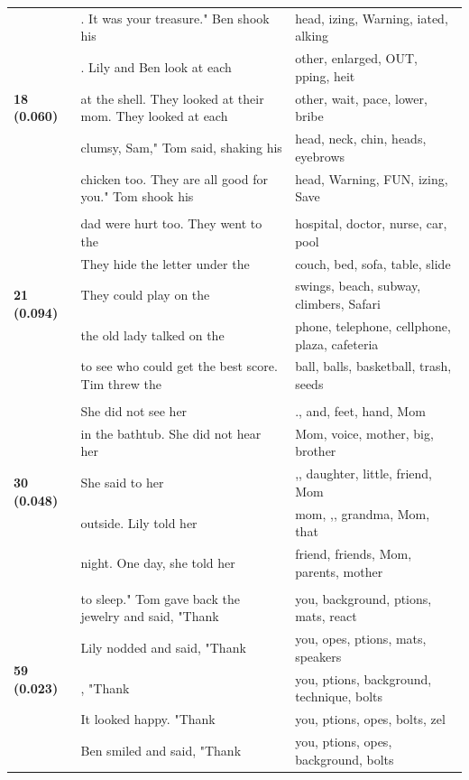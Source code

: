 \documentclass{article}
\theoremstyle{plain}
\theoremstyle{definition}
\theoremstyle{remark}
\begin{document}
\begin{longtable}{|p{}|p{}|p{}|}
\multirow{5}{*}{\textbf{18 (0.060)}} & . It was your treasure."  Ben shook his & head, izing,  Warning, iated, alking \\
& .  Lily and Ben look at each & other,  enlarged,  OUT, pping, heit \\
& at the shell. They looked at their mom. They looked at each & other,  wait,  pace,  lower,  bribe \\
& clumsy, Sam," Tom said, shaking his & head,  neck,  chin,  heads,  eyebrows \\
& chicken too. They are all good for you."  Tom shook his & head,  Warning,  FUN, izing, Save \\
& & \\
\multirow{5}{*}{\textbf{21 (0.094)}} & dad were hurt too. They went to the & hospital,  doctor,  nurse,  car,  pool \\
& They hide the letter under the & couch,  bed,  sofa,  table,  slide \\
& They could play on the & swings,  beach,  subway,  climbers,  Safari \\
& the old lady talked on the & phone,  telephone,  cellphone,  plaza,  cafeteria \\
& to see who could get the best score.  Tim threw the & ball,  balls,  basketball,  trash,  seeds \\
& & \\
\multirow{5}{*}{\textbf{30 (0.048)}} & She did not see her & .,  and,  feet,  hand,  Mom \\
& in the bathtub.  She did not hear her & Mom,  voice,  mother,  big,  brother \\
& She said to her & ,,  daughter,  little,  friend,  Mom \\
& outside.   Lily told her & mom, ,,  grandma,  Mom,  that \\
& night. One day, she told her & friend,  friends,  Mom,  parents,  mother \\
& & \\
\multirow{5}{*}{\textbf{59 (0.023)}} & to sleep." Tom gave back the jewelry and said, "Thank & you,  background, ptions,  mats,  react \\
& Lily nodded and said, "Thank & you, opes, ptions,  mats,  speakers \\
& , "Thank & you, ptions,  background,  technique,  bolts \\
& It looked happy.  "Thank & you, ptions, opes,  bolts, zel \\
& Ben smiled and said, "Thank & you, ptions, opes,  background,  bolts \\

\end{longtable}
\end{document}
